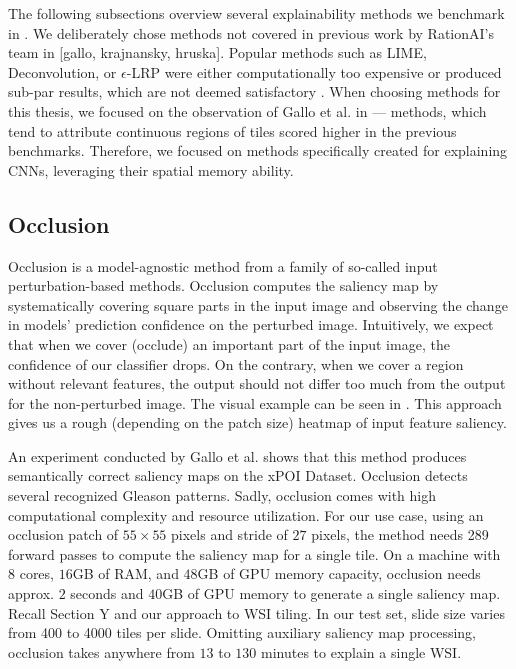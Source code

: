 The following subsections overview several explainability methods we benchmark in .
We deliberately chose methods not covered in previous work by RationAI's team in [gallo, krajnansky, hruska].
Popular methods such as LIME, Deconvolution, or $\epsilon$-LRP  were either computationally too expensive or produced sub-par results, which are not deemed satisfactory \cite{gallo}.
When choosing methods for this thesis, we focused on the observation of Gallo et al. in \cite{gallo} --- methods, which tend to attribute continuous regions of tiles scored higher in the previous benchmarks.
Therefore, we focused on methods specifically created for explaining CNNs, leveraging their spatial memory ability.

\subsection{Occlusion}\label{occlusion}

Occlusion is a model-agnostic method from a family of so-called input perturbation-based methods.
Occlusion computes the saliency map by systematically covering square parts in the input image and observing the change in models' prediction confidence on the perturbed image.
Intuitively, we expect that when we cover (occlude) an important part of the input image, the confidence of our classifier drops.
On the contrary, when we cover a region without relevant features, the output should not differ too much from the output for the non-perturbed image.
The visual example can be seen in . This approach gives us a rough (depending on the patch size) heatmap of input feature saliency.

An experiment conducted by Gallo et al. \cite{gallo} shows that this method produces semantically correct saliency maps on the xPOI Dataset.
Occlusion detects several recognized Gleason patterns.
Sadly, occlusion comes with high computational complexity and resource utilization.
For our use case, using an occlusion patch of $55 \times 55$ pixels and stride of $27$ pixels, the method needs 289 forward passes to compute the saliency map for a single tile.
On a machine with $8$ cores, $16$GB of RAM, and $48$GB of GPU memory capacity, occlusion needs approx. $2$ seconds and $40$GB of GPU memory to generate a single saliency map.
Recall Section Y and our approach to WSI tiling.
In our test set, slide size varies from 400 to 4000 tiles per slide.
Omitting auxiliary saliency map processing, occlusion takes anywhere from $13$ to $130$ minutes to explain a single WSI.

